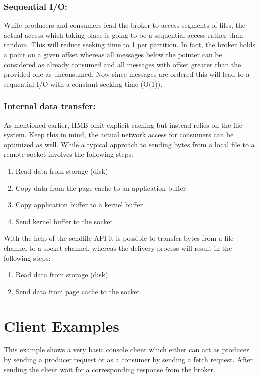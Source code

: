 
\subsubsection{Sequential I/O: }

While producers and consumers lead the broker to access
segments of files, the actual access which taking place is going to be a
sequential access rather than random. This will reduce seeking time to 1 per
partition. In fact, the broker holds a point on a given offset whereas all
messages below the pointer can be considered as already consumed and all
messages with offset greater than the provided one as unconsumed. Now since
messages are ordered this will lead to a sequential I/O with a constant seeking
time (O(1)).


\subsubsection{Internal data transfer:}

As mentioned earlier, HMB omit explicit caching but instead relies on the file system.
Keep this in mind, the actual network access for consumers can be optimized as well.
While a typical approach to sending bytes from a local file to a remote
socket involves the following steps: 
\begin{enumerate}
  \item Read data from storage (disk)
  \item Copy data from the page cache to an application buffer
  \item Copy application buffer to a kernel buffer
  \item Send kernel buffer to the socket
\end{enumerate}

With the help of the sendfile API  it is possible to transfer bytes
from a file channel to a socket channel, whereas the delivery process will
result in the following steps:

\begin{enumerate}
  \item Read data from storage (disk)
  \item Send data from page cache to the socket
\end{enumerate}

\section{Client Examples}
This example shows a very basic console client which either can act as producer
by sending a producer request or as a consumer by sending a fetch request. After
sending the client wait for a corresponding response from the broker.

